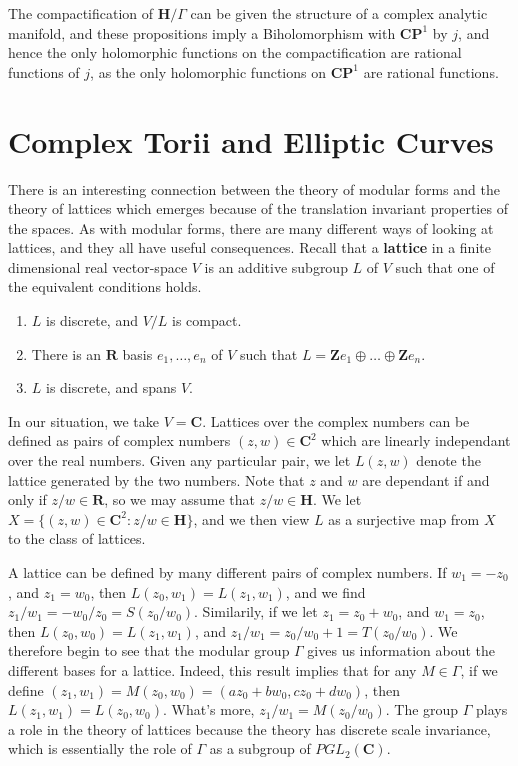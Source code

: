 The compactification of $\mathbf{H}/\Gamma$ can be given the structure of a complex analytic manifold, and these propositions imply a Biholomorphism with $\mathbf{C} \mathbf{P}^1$ by $j$, and hence the only holomorphic functions on the compactification are rational functions of $j$, as the only holomorphic functions on $\mathbf{C} \mathbf{P}^1$ are rational functions.










\chapter{Complex Torii and Elliptic Curves}

There is an interesting connection between the theory of modular forms and the theory of lattices which emerges because of the translation invariant properties of the spaces. As with modular forms, there are many different ways of looking at lattices, and they all have useful consequences. Recall that a {\bf lattice} in a finite dimensional real vector-space $V$ is an additive subgroup $L$ of $V$ such that one of the equivalent conditions holds.
%
\begin{enumerate}
    \item $L$ is discrete, and $V/L$ is compact.
    \item There is an $\mathbf{R}$ basis $e_1, \dots, e_n$ of $V$ such that $L = \mathbf{Z} e_1 \oplus \dots \oplus \mathbf{Z} e_n$.
    \item $L$ is discrete, and spans $V$.
\end{enumerate}
%
In our situation, we take $V = \mathbf{C}$. Lattices over the complex numbers can be defined as pairs of complex numbers $(z,w) \in \mathbf{C}^2$ which are linearly independant over the real numbers. Given any particular pair, we let $L(z,w)$ denote the lattice generated by the two numbers. Note that $z$ and $w$ are dependant if and only if $z/w \in \mathbf{R}$, so we may assume that $z/w \in \mathbf{H}$. We let $X = \{ (z,w) \in \mathbf{C}^2 : z/w \in \mathbf{H} \}$, and we then view $L$ as a surjective map from $X$ to the class of lattices.

A lattice can be defined by many different pairs of complex numbers. If $w_1 = -z_0$, and $z_1 = w_0$, then $L(z_0,w_1) = L(z_1,w_1)$, and we find $z_1/w_1 = -w_0/z_0 = S(z_0/w_0)$. Similarily, if we let $z_1 = z_0 + w_0$, and $w_1 = z_0$, then $L(z_0,w_0) = L(z_1,w_1)$, and $z_1/w_1 = z_0/w_0 + 1 = T(z_0/w_0)$. We therefore begin to see that the modular group $\Gamma$ gives us information about the different bases for a lattice. Indeed, this result implies that for any $M \in \Gamma$, if we define $(z_1,w_1) = M(z_0,w_0) = (az_0 + bw_0, cz_0 + dw_0)$, then $L(z_1,w_1) = L(z_0,w_0)$. What's more, $z_1/w_1 = M(z_0/w_0)$. The group $\Gamma$ plays a role in the theory of lattices because the theory has discrete scale invariance, which is essentially the role of $\Gamma$ as a subgroup of $PGL_2(\mathbf{C})$.

